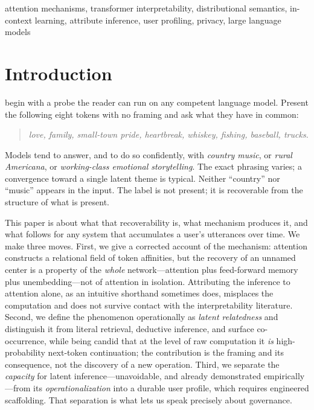 \documentclass[conference]{IEEEtran}
\theoremstyle{definition}
\begin{document}
\begin{IEEEkeywords}
attention mechanisms, transformer interpretability, distributional semantics, in-context learning, attribute inference, user profiling, privacy, large language models
\end{IEEEkeywords}

\section{Introduction}

 begin with a probe the reader can run on any competent language model. Present the following eight tokens with no framing and ask what they have in common:
\begin{quote}\itshape
love, family, small-town pride, heartbreak, whiskey, fishing, baseball, trucks.
\end{quote}
Models tend to answer, and to do so confidently, with \emph{country music}, or \emph{rural Americana}, or \emph{working-class emotional storytelling}. The exact phrasing varies; a convergence toward a single latent theme is typical. Neither ``country'' nor ``music'' appears in the input. The label is not present; it is recoverable from the structure of what is present.

This paper is about what that recoverability is, what mechanism produces it, and what follows for any system that accumulates a user's utterances over time. We make three moves. First, we give a corrected account of the mechanism: attention constructs a relational field of token affinities, but the recovery of an unnamed center is a property of the \emph{whole} network---attention plus feed-forward memory plus unembedding---not of attention in isolation. Attributing the inference to attention alone, as an intuitive shorthand sometimes does, misplaces the computation and does not survive contact with the interpretability literature. Second, we define the phenomenon operationally as \emph{latent relatedness} and distinguish it from literal retrieval, deductive inference, and surface co-occurrence, while being candid that at the level of raw computation it \emph{is} high-probability next-token continuation; the contribution is the framing and its consequence, not the discovery of a new operation. Third, we separate the \emph{capacity} for latent inference---unavoidable, and already demonstrated empirically---from its \emph{operationalization} into a durable user profile, which requires engineered scaffolding. That separation is what lets us speak precisely about governance.
\end{document}
